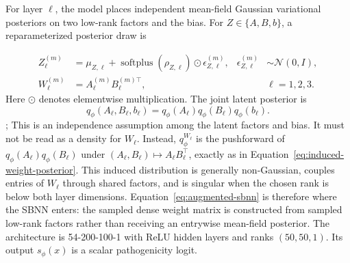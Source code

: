\documentclass[11pt]{article}
\begin{document}
For layer $\ell$, the model places independent mean-field Gaussian variational posteriors on two low-rank factors and the bias. For $Z\in\{A,B,b\}$, a reparameterized posterior draw is

\begin{equation}
\begin{aligned}
Z_\ell^{(m)}
&=\mu_{Z,\ell}+\operatorname{softplus}(\rho_{Z,\ell})\odot
\epsilon_{Z,\ell}^{(m)},
&\epsilon_{Z,\ell}^{(m)}&\sim\mathcal{N}(0,I),\\
W_\ell^{(m)}&=A_\ell^{(m)}B_\ell^{(m)\top},
&&\ell=1,2,3.
\end{aligned}
\label{eq:augmented-sbnn}
\end{equation}
Here $\odot$ denotes elementwise multiplication. The joint latent posterior is
\[
q_\phi(A_\ell,B_\ell,b_\ell)
=q_\phi(A_\ell)q_\phi(B_\ell)q_\phi(b_\ell).
\]; This is an independence assumption among the latent factors and bias. It must not be read as a density for $W_\ell$. Instead, $q_\phi^{W_\ell}$ is the pushforward of $q_\phi(A_\ell)q_\phi(B_\ell)$ under $(A_\ell,B_\ell)\mapsto A_\ell B_\ell^\top$, exactly as in Equation~\ref{eq:induced-weight-posterior}. This induced distribution is generally non-Gaussian, couples entries of $W_\ell$ through shared factors, and is singular when the chosen rank is below both layer dimensions. Equation~\ref{eq:augmented-sbnn} is therefore where the SBNN enters: the sampled dense weight matrix is constructed from sampled low-rank factors rather than receiving an entrywise mean-field posterior. The architecture is 54-200-100-1 with ReLU hidden layers and ranks $(50,50,1)$. Its output $s_\phi(x)$ is a scalar pathogenicity logit.
\end{document}
